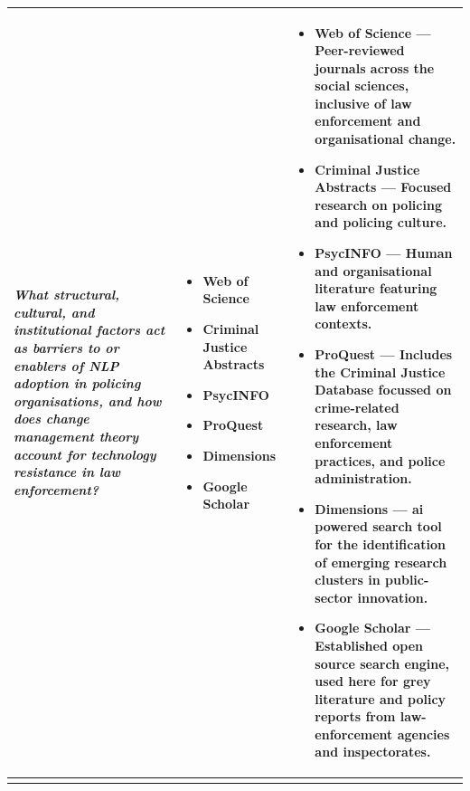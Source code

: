 \begin{longtable}{%
  >{\centering\arraybackslash}p{4.4cm}%
  >{\centering\arraybackslash}p{2.6cm}%
  >{\centering\arraybackslash}p{7.7cm}%
}
\textit{What structural, cultural, and institutional factors act as barriers to or
enablers of NLP adoption in policing organisations, and how does change management
theory account for technology resistance in law enforcement?} &
%
\begin{itemize}[leftmargin=*,nosep,topsep=2pt,partopsep=0pt,itemindent=0pt,align=left]
  \item Web of Science
  \item Criminal Justice Abstracts
  \item PsycINFO
  \item ProQuest
  \item Dimensions
  \item Google Scholar
\end{itemize} &
%
\begin{itemize}[leftmargin=*,nosep,topsep=2pt,partopsep=0pt,itemindent=0pt,align=left]
  \item \textbf{Web of Science} --- Peer-reviewed journals across the social sciences, inclusive of law enforcement and organisational change.
  \item \textbf{Criminal Justice Abstracts} --- Focused research on policing and policing culture.
  \item \textbf{PsycINFO} --- Human and organisational literature featuring law enforcement contexts.
  \item \textbf{ProQuest} --- Includes the Criminal Justice Database focussed on crime-related research, law enforcement practices, and police administration.
  \item \textbf{Dimensions} --- \gls{ai} powered search tool for the identification of emerging research clusters in public-sector innovation.
  \item \textbf{Google Scholar} --- Established open source search engine, used here for grey literature and policy reports from law-enforcement agencies and inspectorates.
\end{itemize} \\[8pt]

\midrule


\multicolumn{3}{c}{%
  \cellcolor{track4lt}\textcolor{track4}{%
    \textbf{Track 4 \textemdash{} Ethics, Law \& Governance}}}\\[2pt]


\end{longtable}
